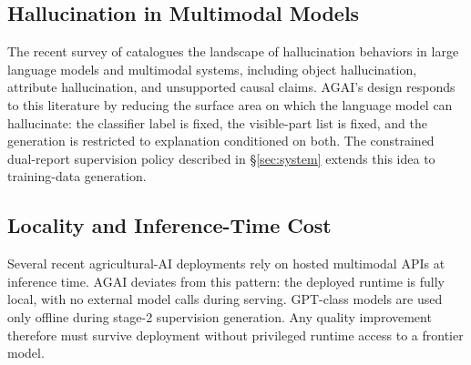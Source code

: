 \subsection{Hallucination in Multimodal Models}

The recent survey of \citet{huang2024hallucinationsurvey} catalogues
the landscape of hallucination behaviors in large language models and
multimodal systems, including object hallucination, attribute
hallucination, and unsupported causal claims. AGAI's design responds to
this literature by reducing the surface area on which the language model
can hallucinate: the classifier label is fixed, the visible-part list is
fixed, and the generation is restricted to explanation conditioned on
both. The constrained dual-report supervision policy described in
\S\ref{sec:system} extends this idea to training-data generation.

\subsection{Locality and Inference-Time Cost}

Several recent agricultural-AI deployments rely on hosted multimodal APIs
at inference time. AGAI deviates from this pattern: the deployed runtime
is fully local, with no external model calls during serving. GPT-class
models are used only offline during stage-2 supervision generation. Any
quality improvement therefore must survive deployment without privileged
runtime access to a frontier model.
